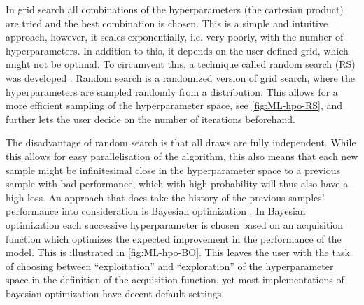 In grid search all combinations of the hyperparameters (the cartesian product) are tried and the best combination is chosen. This is a simple and intuitive approach, however, it scales exponentially, i.e. very poorly, with the number of hyperparameters. In addition to this, it depends on the user-defined grid, which might not be optimal. To circumvent this, a technique called random search (RS) was developed \parencite{bergstraRandomSearchHyperparameter2012a}. Random search is a randomized version of grid search, where the hyperparameters are sampled randomly from a distribution. This allows for a more efficient sampling of the hyperparameter space, see \autoref{fig:ML-hpo-RS}, and further lets the user decide on the number of iterations beforehand.


The disadvantage of random search is that all draws are fully independent. While this allows for easy parallelisation of the algorithm, this also means that each new sample might be infinitesimal close in the hyperparameter space to a previous sample with bad performance, which with high probability will thus also have a high loss. An approach that does take the history of the previous samples' performance into consideration is Bayesian optimization \parencite{brochuTutorialBayesianOptimization2010a}. In Bayesian optimization each successive hyperparameter is chosen based on an acquisition function which optimizes the expected improvement in the performance of the model. This is illustrated in \autoref{fig:ML-hpo-BO}. This leaves the user with the task of choosing between ``exploitation'' and ``exploration'' of the hyperparameter space in the definition of the acquisition function, yet most implementations of bayesian optimization have decent default settings.

